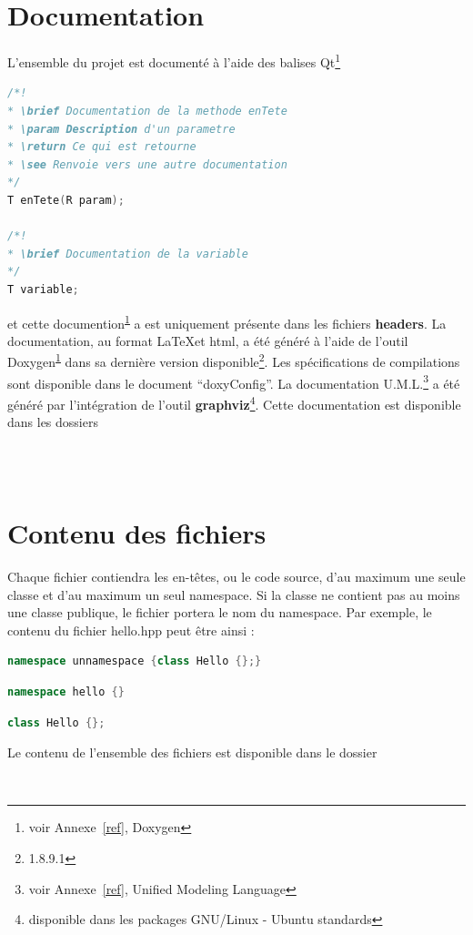 \documentclass[a4paper,11pt]{report}
\begin{document}
\section{Documentation}
L'ensemble du projet est documenté à l'aide des balises Qt\footnote{\label{doc}voir
Annexe~\ref{ref}, Doxygen}
\begin{lstlisting}[frame=single,language=C++]
/*!
* \brief Documentation de la methode enTete
* \param Description d'un parametre
* \return Ce qui est retourne
* \see Renvoie vers une autre documentation
*/
T enTete(R param);

/*!
* \brief Documentation de la variable
*/
T variable;
\end{lstlisting}
et cette documention\textsuperscript{\ref{doc}} a est uniquement présente dans les fichiers \textbf{headers}.
La documentation, au format \LaTeX et html, a été généré à l'aide de l'outil
Doxygen\textsuperscript{\ref{doc}} dans sa dernière version
disponible\footnote{1.8.9.1}. Les spécifications de compilations sont disponible
dans le document ``doxyConfig''. La documentation
U.M.L.\footnote{voir Annexe~\ref{ref}, Unified Modeling Language} a été généré 
par l'intégration de l'outil \textbf{graphviz}\footnote{disponible dans les packages GNU/Linux -
Ubuntu standards}.
Cette documentation est disponible dans les dossiers
\begin{center}
	 \\
	 \\
\end{center}
\section{Contenu des fichiers}
Chaque fichier contiendra les en-têtes, ou le code source, d'au maximum une seule 
classe et d'au maximum un seul namespace. Si la classe ne contient pas au moins
une classe publique, le fichier portera le nom du namespace.
Par exemple, le contenu du fichier hello.hpp peut être ainsi :
\begin{lstlisting}[frame=single,language=C++]
namespace unnamespace {class Hello {};}
\end{lstlisting}
\begin{lstlisting}[frame=single,language=C++]
namespace hello {}
\end{lstlisting}
\begin{lstlisting}[frame=single,language=C++]
class Hello {};
\end{lstlisting}
Le contenu de l'ensemble des fichiers est disponible dans le dossier
\begin{center}
	 \\
\end{center}
\end{document}
